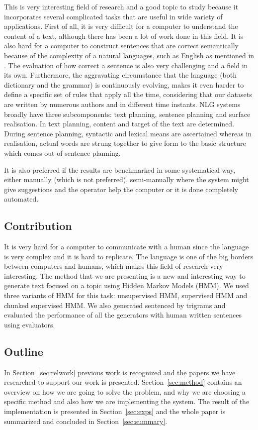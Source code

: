 \documentclass[a4paper,12pt]{article}
\begin{document}
This is very interesting field of research and a good topic to study because it
incorporates several complicated tasks that are useful in wide variety of
applications. First of all, it is very difficult for a computer to understand
the content of a text, although there has been a lot of work done in this field. 
It is also hard for a computer to construct sentences that are correct
semantically because of the complexity of a natural languages, such as English
as mentioned in \cite{nlgScratch}. The evaluation of how correct a sentence is 
also very challenging and a field in its own. Furthermore, the 
aggravating circumstance that the language (both dictionary and the grammar)
is continuously evolving, makes it even harder to define a specific set of rules 
that apply all the time, considering that our datasets are written by numerous
authors and in different time instants. NLG systems broadly have three
subcomponents: text planning, sentence planning and surface realisation.
In text planning, content and target of the text are determined. During sentence
planning, syntactic and lexical means are ascertained whereas in realisation, 
actual words are strung together to give form to the basic structure which comes out
of sentence planning. 

It is also preferred if the results are benchmarked in some systematical way,
either manually (which is not preferred), semi-manually where the system might
give suggestions and the operator help the computer or it is done completely
automated.


\subsection{Contribution}
It is very hard for a computer to communicate with a human since the language is
very complex and it is hard to replicate. The language is one of the big
borders between computers and humans, which makes this field of research very
interesting. The method that we are presenting is a new and interesting way to
generate text focused on a topic using Hidden Markov Models (HMM). We used
three variants of HMM for this task: unsupervised HMM, supervised HMM and 
chunked supervised HMM. We also generated sentenced by trigrams and evaluated
the performance of all the generators with human written sentences using evaluators.

\subsection{Outline}
In Section~\ref{sec:relwork} previous work is recognized and the papers we have
researched to support our work is presented. Section~\ref{sec:method} contains
an overview on how we are going to solve the problem, and why we are choosing a
specific method and also how we are implementing the system. The result of the
implementation is presented in Section~\ref{sec:exps} and the whole paper is
summarized and concluded in Section~\ref{sec:summary}.
\end{document}
